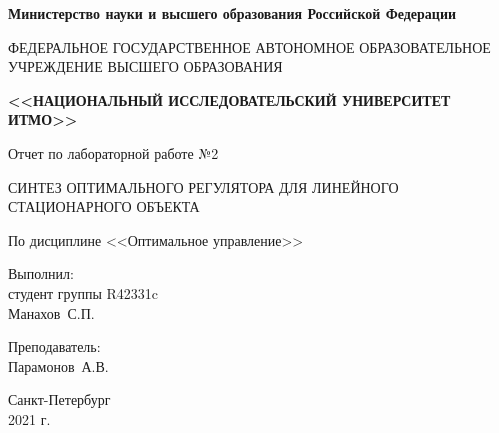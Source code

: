 \begin{titlepage}
	\begin{center}
		\begin{small}
			\textbf{Министерство науки и высшего образования Российской Федерации}

			ФЕДЕРАЛЬНОЕ ГОСУДАРСТВЕННОЕ АВТОНОМНОЕ ОБРАЗОВАТЕЛЬНОЕ УЧРЕЖДЕНИЕ ВЫСШЕГО ОБРАЗОВАНИЯ
			
			\textbf{<<НАЦИОНАЛЬНЫЙ ИССЛЕДОВАТЕЛЬСКИЙ УНИВЕРСИТЕТ ИТМО>>}
		\end{small}
		
		\vspace{8em}
		
		Отчет по лабораторной работе №2
		
		СИНТЕЗ ОПТИМАЛЬНОГО РЕГУЛЯТОРА ДЛЯ ЛИНЕЙНОГО СТАЦИОНАРНОГО ОБЪЕКТА
		
		По дисциплине <<Оптимальное управление>>
	\end{center}
	
	\vspace{8em}
	
	\begin{flushright}
		Выполнил:\\
		студент группы R42331c\\
		Манахов~С.П.
		
		\vspace{1em}
		
		Преподаватель:\\
		Парамонов~А.В.
	\end{flushright}

	\vfill
	
	\begin{center}
		\small
		Санкт-Петербург\\
		2021 г.\\
	\end{center}
\end{titlepage}